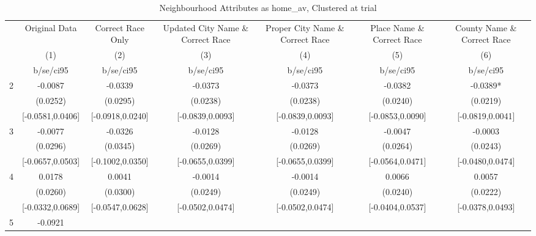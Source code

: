 \documentclass{article}
\begin{document}
\begin{table}[htbp]\centering
\def\sym#1{\ifmmode^{#1}\else\(^{#1}\)\fi}
\caption{Neighbourhood Attributes as home\_av, Clustered at trial}
\begin{tabular}{l*{6}{c}}
\toprule
                    &\multicolumn{1}{c}{Original Data}&\multicolumn{1}{c}{Correct Race Only}&\multicolumn{1}{c}{Updated City Name \& Correct Race}&\multicolumn{1}{c}{Proper City Name \& Correct Race}&\multicolumn{1}{c}{Place Name \& Correct Race}&\multicolumn{1}{c}{County Name \& Correct Race}\\\cmidrule(lr){2-2}\cmidrule(lr){3-3}\cmidrule(lr){4-4}\cmidrule(lr){5-5}\cmidrule(lr){6-6}\cmidrule(lr){7-7}
                    &\multicolumn{1}{c}{(1)}   &\multicolumn{1}{c}{(2)}   &\multicolumn{1}{c}{(3)}   &\multicolumn{1}{c}{(4)}   &\multicolumn{1}{c}{(5)}   &\multicolumn{1}{c}{(6)}   \\
                    &   b/se/ci95   &   b/se/ci95   &   b/se/ci95   &   b/se/ci95   &   b/se/ci95   &   b/se/ci95   \\
\midrule
2                   &     -0.0087   &     -0.0339   &     -0.0373   &     -0.0373   &     -0.0382   &     -0.0389*  \\
                    &    (0.0252)   &    (0.0295)   &    (0.0238)   &    (0.0238)   &    (0.0240)   &    (0.0219)   \\
                    &[-0.0581,0.0406]   &[-0.0918,0.0240]   &[-0.0839,0.0093]   &[-0.0839,0.0093]   &[-0.0853,0.0090]   &[-0.0819,0.0041]   \\
3                   &     -0.0077   &     -0.0326   &     -0.0128   &     -0.0128   &     -0.0047   &     -0.0003   \\
                    &    (0.0296)   &    (0.0345)   &    (0.0269)   &    (0.0269)   &    (0.0264)   &    (0.0243)   \\
                    &[-0.0657,0.0503]   &[-0.1002,0.0350]   &[-0.0655,0.0399]   &[-0.0655,0.0399]   &[-0.0564,0.0471]   &[-0.0480,0.0474]   \\
4                   &      0.0178   &      0.0041   &     -0.0014   &     -0.0014   &      0.0066   &      0.0057   \\
                    &    (0.0260)   &    (0.0300)   &    (0.0249)   &    (0.0249)   &    (0.0240)   &    (0.0222)   \\
                    &[-0.0332,0.0689]   &[-0.0547,0.0628]   &[-0.0502,0.0474]   &[-0.0502,0.0474]   &[-0.0404,0.0537]   &[-0.0378,0.0493]   \\
5                   &     -0.0921   &               &               &               &               &               \\

\end{tabular}
\end{table}
\end{document}
